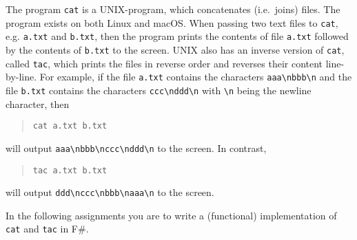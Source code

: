 The program \lstinline[language=console]{cat} is a UNIX-program, which concatenates (i.e.\ joins) files. The program exists on both Linux and macOS. When passing two text files to \lstinline[language=console]{cat}, e.g. \lstinline[language=console]{a.txt} and \lstinline[language=console]{b.txt}, then the program prints the contents of file \lstinline[language=console]{a.txt} followed by the contents of \lstinline[language=console]{b.txt} to the screen. UNIX also has an inverse version of \texttt{cat}, called \texttt{tac}, which prints the files in reverse order and reverses their content line-by-line. For example, if the file \lstinline[language=console]{a.txt} contains the characters \lstinline[language=console]{aaa\nbbb\n} and the file \lstinline[language=console]{b.txt} contains the characters \lstinline[language=console]{ccc\nddd\n} with \lstinline[language=console]{\n} being the newline character, then
\begin{quote}
\lstinline[language=console]{cat a.txt b.txt}
\end{quote}
will output \lstinline[language=console]{aaa\nbbb\nccc\nddd\n} to the screen. In contrast,
\begin{quote}
\lstinline[language=console]{tac a.txt b.txt}
\end{quote}
will output \lstinline[language=console]{ddd\nccc\nbbb\naaa\n} to the screen.

In the following assignments you are to write a (functional) implementation of \lstinline[language=console]{cat} and \lstinline[language=console]{tac} in F\#.
